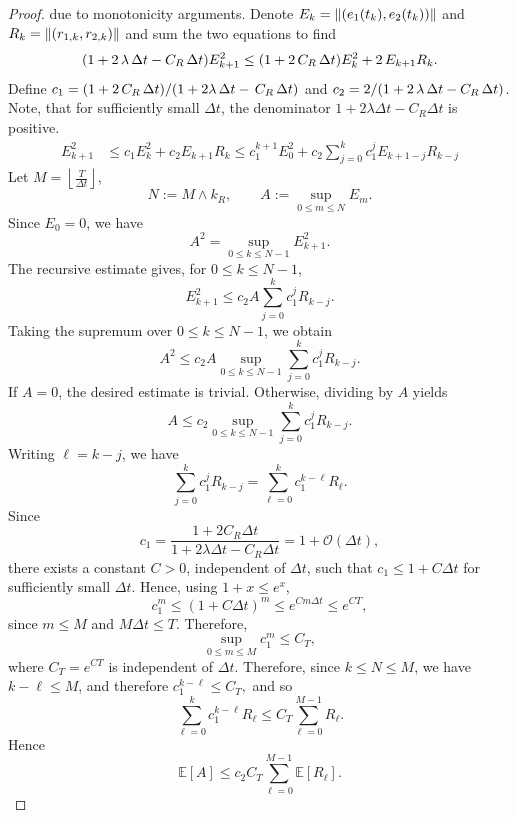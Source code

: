 \documentclass[11pt, twoside]{report}
\begin{document}
\begin{proof}
 due to monotonicity arguments. Denote $E_k = \left\lVert(e_1(t_{k}),e_2(t_k)) \right\rVert$ and  $R_k= \left\lVert(r_{1,k},r_{2,k})\right\rVert$ and sum the two equations to find 
\begin{align*}
    \pa{1 + 2\,\lambda \,\deltat -  C_R\,\tstep} E_{k+1}^2 \leq \pa{1+ 2\,C_R \,\deltat } E_k^2 +   2\,E_{k+1} R_k .
\end{align*}
Define $c_1 = \pa{1+ 2\,C_R\, \deltat }/ \pa{1 + 2\lambda\, \deltat - \,C_R\,\tstep}$ and $c_2 = 2/ \pa{1 + 2\,\lambda\, \deltat -  C_R\,\tstep}$. Note, that for sufficiently small \(\Delta t\), the denominator
\(1+2\lambda\Delta t-C_R\Delta t\) is positive.
\begin{align*}
    E_{k+1}^2 &\leq c_1 E_k^2 + c_2 E_{k+1} R_k \leq c_1^{k+1} E_{0}^2 + c_2 \sum_{j=0}^{k} c_1^j  E_{k+1-j} R_{k-j}
 \end{align*}
Let $M=\left\lfloor\frac{T}{\Delta t}\right\rfloor$,
\[
N:=M\wedge k_R,
\qquad
A:=\sup_{0\leq m\leq N}E_m .
\]
Since \(E_0=0\), we have
\[
A^2=\sup_{0\leq k\leq N-1}E_{k+1}^2 .
\]
The recursive estimate gives, for \(0\leq k\leq N-1\),
\[
E_{k+1}^2
\leq
c_2 A\sum_{j=0}^{k}c_1^jR_{k-j}.
\]
Taking the supremum over \(0\leq k\leq N-1\), we obtain
\[
A^2
\leq
c_2 A
\sup_{0\leq k\leq N-1}
\sum_{j=0}^{k}c_1^jR_{k-j}.
\]
If \(A=0\), the desired estimate is trivial. Otherwise, dividing by \(A\) yields
\[
A
\leq
c_2
\sup_{0\leq k\leq N-1}
\sum_{j=0}^{k}c_1^jR_{k-j}.
\]
Writing \(\ell=k-j\), we have
\[
\sum_{j=0}^{k}c_1^jR_{k-j}
=
\sum_{\ell=0}^{k}c_1^{k-\ell}R_\ell .
\]
Since
\[
c_1=\frac{1+2C_R\Delta t}{1+2\lambda\Delta t-C_R\Delta t}
=1+\mathcal O(\Delta t),
\]
there exists a constant \(C>0\), independent of \(\Delta t\), such that
\(c_1\le 1+C\Delta t\) for sufficiently small \(\Delta t\). Hence, using
\(1+x\le e^x\),
\[
c_1^m
\le (1+C\Delta t)^m
\le e^{Cm\Delta t}
\le e^{CT},
\]
since \(m\le M\) and \(M\Delta t\le T\). Therefore,
\[
\sup_{0\le m\le M} c_1^m\le C_T,
\]
where \(C_T=e^{CT}\) is independent of \(\Delta t\).
Therefore, since $k \leq N \leq M$, we have $k-\ell \leq M$, and therefore $c_1^{k-\ell} \leq  C_T,$ and so
\[
\sum_{\ell=0}^{k}c_1^{k-\ell}R_\ell
\leq
C_T\sum_{\ell=0}^{M-1}R_\ell .
\]
Hence
\[
\mathbb E[A]
\leq
c_2 C_T
\sum_{\ell=0}^{M-1}\mathbb E[R_\ell].
\]



\end{proof}
\end{document}
